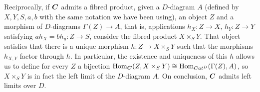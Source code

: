 \begin{sol}
\begin{enumerate}[label=\alph*)]
		Reciprocally, if $\boldsymbol{C}$ admits a fibred product, given a $D$-diagram $A$ (defined by $X,Y,S,a,b$ with the same notation we have been using), an object $Z$ and a morphism of $D$-diagrams $\Gamma(Z) \to A$, that is, applications $h_X: Z \to X$, $h_Y: Z \to Y$ satisfying $ah_X = bh_y: Z \to S$, consider the fibred product $X \times_S Y$. That object satisfies that there is a unique morphism $h: Z \to X \times_S Y$ such that the morphisms $h_{X,Y}$ factor through $h$. In particular, the existence and uniqueness of this $h$ allows us to define for every $Z$ a bijection $\mathrm{Hom}_{\boldsymbol{C}}(Z, X \times_S Y) \cong \mathrm{Hom}_{Cat^D}(\Gamma(Z), A)$, so $X \times_S Y$ is in fact the left limit of the $D$-diagram $A$. On conclusion, $\boldsymbol{C}$ admits left limits over $D$.
	\end{enumerate}
\end{sol}

